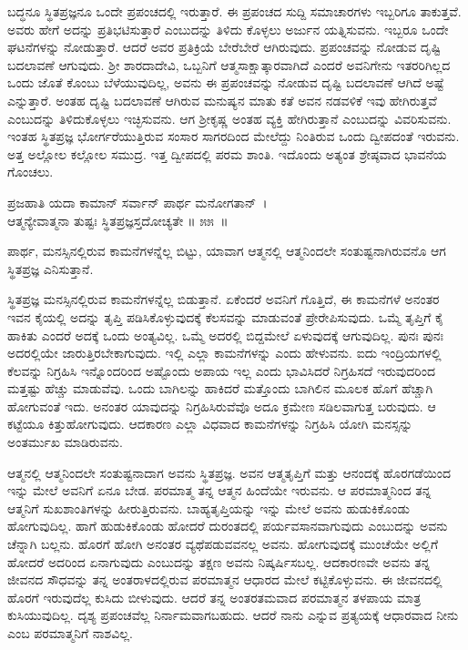 ಬದ್ಧನೂ ಸ್ಥಿತಪ್ರಜ್ಞನೂ ಒಂದೇ ಪ್ರಪಂಚದಲ್ಲಿ ಇರುತ್ತಾರೆ. ಈ ಪ್ರಪಂಚದ ಸುದ್ದಿ ಸಮಾಚಾರಗಳು ಇಬ್ಬರಿಗೂ ತಾಕುತ್ತವೆ. ಅವರು ಹೇಗೆ ಅದನ್ನು ಪ್ರತಿಭಟಿಸುತ್ತಾರೆ ಎಂಬುದನ್ನು ತಿಳಿದು ಕೊಳ್ಳಲು ಅರ್ಜುನ ಯತ್ನಿಸುವನು. ಇಬ್ಬರೂ ಒಂದೇ ಘಟನೆಗಳನ್ನು ನೋಡುತ್ತಾರೆ. ಆದರೆ ಅವರ ಪ್ರತಿಕ್ರಿಯೆ ಬೇರೆಬೇರೆ ಆಗಿರುವುದು. ಪ್ರಪಂಚವನ್ನು ನೋಡುವ ದೃಷ್ಟಿ ಬದಲಾವಣೆ ಆಗುವುದು. ಶ‍್ರೀ ಶಾರದಾದೇವಿ, ಒಬ್ಬನಿಗೆ ಆತ್ಮಸಾಕ್ಷಾತ್ಕಾರವಾಗಿದೆ ಎಂದರೆ ಅವನಿಗೇನು ಇತರರಿಗಿಲ್ಲದ ಒಂದು ಜೊತೆ ಕೊಂಬು ಬೆಳೆಯುವುದಿಲ್ಲ, ಅವನು ಈ ಪ್ರಪಂಚವನ್ನು ನೋಡುವ ದೃಷ್ಟಿ ಬದಲಾವಣೆ ಆಗಿದೆ ಅಷ್ಟೆ ಎನ್ನುತ್ತಾರೆ. ಅಂತಹ ದೃಷ್ಟಿ ಬದಲಾವಣೆ ಆಗಿರುವ ಮನುಷ್ಯನ ಮಾತು ಕತೆ ಅವನ ನಡವಳಿಕೆ ಇವು ಹೇಗಿರುತ್ತವೆ ಎಂಬುದನ್ನು ತಿಳಿದುಕೊಳ್ಳಲು ಇಚ್ಛಿಸುವನು. ಆಗ ಶ‍್ರೀಕೃಷ್ಣ ಅಂತಹ ವ್ಯಕ್ತಿ ಹೇಗಿರುತ್ತಾನೆ ಎಂಬುದನ್ನು ವಿವರಿಸುವನು. ಇಂತಹ ಸ್ಥಿತಪ್ರಜ್ಞ ಭೋರ್ಗರೆಯುತ್ತಿರುವ ಸಂಸಾರ ಸಾಗರದಿಂದ ಮೇಲೆದ್ದು ನಿಂತಿರುವ ಒಂದು ದ್ವೀಪದಂತೆ ಇರು\-ವನು. ಅತ್ತ ಅಲ್ಲೋಲ ಕಲ್ಲೋಲ ಸಮುದ್ರ. ಇತ್ತ ದ್ವೀಪದಲ್ಲಿ ಪರಮ ಶಾಂತಿ. ಇದೊಂದು ಅತ್ಯಂತ ಶ್ರೇಷ್ಠವಾದ ಭಾವನೆಯ ಗೊಂಚಲು.

\begin{shloka}
ಪ್ರಜಹಾತಿ ಯದಾ ಕಾಮಾನ್ ಸರ್ವಾನ್ ಪಾರ್ಥ ಮನೋಗತಾನ್~।\\ಆತ್ಮನ್ಯೇವಾತ್ಮನಾ ತುಷ್ಟಃ ಸ್ಥಿತಪ್ರಜ್ಞಸ್ತದೋಚ್ಯತೇ \hfill॥ ೫೫~॥
\end{shloka}

\begin{artha}
ಪಾರ್ಥ, ಮನಸ್ಸಿನಲ್ಲಿರುವ ಕಾಮನೆಗಳನ್ನೆಲ್ಲ ಬಿಟ್ಟು, ಯಾವಾಗ ಆತ್ಮನಲ್ಲಿ ಆತ್ಮನಿಂದಲೇ ಸಂತುಷ್ಟ\-ನಾಗಿರುವನೊ ಆಗ ಸ್ಥಿತಪ್ರಜ್ಞ ಎನಿಸುತ್ತಾನೆ.
\end{artha}

ಸ್ಥಿತಪ್ರಜ್ಞ ಮನಸ್ಸಿನಲ್ಲಿರುವ ಕಾಮನೆಗಳನ್ನೆಲ್ಲ ಬಿಡುತ್ತಾನೆ. ಏಕೆಂದರೆ ಅವನಿಗೆ ಗೊತ್ತಿದೆ, ಈ ಕಾಮನೆಗಳೆ ಅನಂತರ ಇವನ ಕೈಯಲ್ಲಿ ಅದನ್ನು ತೃಪ್ತಿ ಪಡಿಸಿಕೊಳ್ಳುವುದಕ್ಕೆ ಕೆಲಸವನ್ನು ಮಾಡುವಂತೆ ಪ್ರೇರೇಪಿಸುವುದು. ಒಮ್ಮೆ ತೃಪ್ತಿಗೆ ಕೈ ಹಾಕಿತು ಎಂದರೆ ಅದಕ್ಕೆ ಒಂದು ಅಂತ್ಯವಿಲ್ಲ. ಒಮ್ಮೆ ಅದರಲ್ಲಿ ಬಿದ್ದಮೇಲೆ ಏಳುವುದಕ್ಕೆ ಆಗುವುದಿಲ್ಲ. ಪುನಃ ಪುನಃ ಅದರಲ್ಲಿಯೇ ಜಾರುತ್ತಿರಬೇಕಾಗುವುದು. ಇಲ್ಲಿ ಎಲ್ಲಾ ಕಾಮನೆಗಳನ್ನು ಎಂದು ಹೇಳುವನು. ಐದು ಇಂದ್ರಿಯಗಳಲ್ಲಿ ಕೆಲವನ್ನು ನಿಗ್ರಹಿಸಿ ಇನ್ನೊಂದರಿಂದ ಅಷ್ಟೊಂದು ಅಪಾಯ ಇಲ್ಲ ಎಂದು ಭಾವಿಸಿದರೆ ನಿಗ್ರಹಿಸದೆ ಇರುವುದರಿಂದ ಮತ್ತಷ್ಟು ಹೆಚ್ಚು ಮಾಡುವೆವು. ಒಂದು ಬಾಗಿಲನ್ನು ಹಾಕಿದರೆ ಮತ್ತೊಂದು ಬಾಗಿಲಿನ ಮೂಲಕ ಹೊಗೆ ಹೆಚ್ಚಾಗಿ ಹೋಗುವಂತೆ ಇದು. ಅನಂತರ ಯಾವುದನ್ನು ನಿಗ್ರಹಿಸಿರುವೆವೊ ಅದೂ ಕ್ರಮೇಣ ಸಡಿಲವಾಗುತ್ತ ಬರುವುದು. ಆ ಕಟ್ಟೆಯೂ ಕಿತ್ತುಹೋಗುವುದು. ಆದಕಾರಣ ಎಲ್ಲಾ ವಿಧವಾದ ಕಾಮನೆಗಳನ್ನು ನಿಗ್ರಹಿಸಿ ಯೋಗಿ ಮನಸ್ಸನ್ನು ಅಂತರ್ಮುಖ ಮಾಡಿರುವನು.

\newpage

ಆತ್ಮನಲ್ಲಿ ಆತ್ಮನಿಂದಲೇ ಸಂತುಷ್ಟನಾದಾಗ ಅವನು ಸ್ಥಿತಪ್ರಜ್ಞ. ಅವನ ಆತ್ಮತೃಪ್ತಿಗೆ ಮತ್ತು ಆನಂದಕ್ಕೆ ಹೊರಗಡೆಯಿಂದ ಇನ್ನು ಮೇಲೆ ಅವನಿಗೆ ಏನೂ ಬೇಡ. ಪರಮಾತ್ಮ ತನ್ನ ಆತ್ಮನ ಹಿಂದೆಯೇ ಇರುವನು. ಆ ಪರಮಾತ್ಮನಿಂದ ತನ್ನ ಆತ್ಮನಿಗೆ ಸುಖಶಾಂತಿಗಳನ್ನು ಹೀರುತ್ತಿರುವನು. ಬಾಹ್ಯತೃಪ್ತಿಯನ್ನು ಇನ್ನು ಮೇಲೆ ಅವನು ಹುಡುಕಿಕೊಂಡು ಹೋಗುವುದಿಲ್ಲ. ಹಾಗೆ ಹುಡುಕಿಕೊಂಡು ಹೋದರೆ ದುರಂತದಲ್ಲಿ ಪರ್ಯವಸಾನವಾಗುವುದು ಎಂಬುದನ್ನು ಅವನು ಚೆನ್ನಾಗಿ ಬಲ್ಲನು. ಹೊರಗೆ ಹೋಗಿ ಅನಂತರ ವ್ಯಥೆಪಡುವವನಲ್ಲ ಅವನು. ಹೋಗುವುದಕ್ಕೆ ಮುಂಚೆಯೇ ಅಲ್ಲಿಗೆ ಹೋದರೆ ಅದರಿಂದ ಏನಾಗುವುದು ಎಂಬುದನ್ನು ತಕ್ಷಣ ಅವನು ನಿಷ್ಕರ್ಷಿಸಬಲ್ಲ. ಆದಕಾರಣವೇ ಅವನು ತನ್ನ ಜೀವನದ ಸೌಧವನ್ನು ತನ್ನ ಅಂತರಾಳದಲ್ಲಿರುವ ಪರಮಾತ್ಮನ ಆಧಾರದ ಮೇಲೆ ಕಟ್ಟಿಕೊಳ್ಳುವನು. ಈ ಜೀವನದಲ್ಲಿ ಹೊರಗೆ ಇರುವುದೆಲ್ಲ ಕುಸಿದು ಬೀಳುವುದು. ಆದರೆ ತನ್ನ ಅಂತರತಮವಾದ ಪರಮಾತ್ಮನ ತಳಪಾಯ ಮಾತ್ರ ಕುಸಿಯುವುದಿಲ್ಲ. ದೃಶ್ಯ ಪ್ರಪಂಚವೆಲ್ಲ ನಿರ್ನಾಮವಾಗಬಹುದು. ಆದರೆ ನಾನು ಎನ್ನುವ ಪ್ರತ್ಯಯಕ್ಕೆ ಆಧಾರವಾದ ನೀನು ಎಂಬ ಪರಮಾತ್ಮನಿಗೆ ನಾಶವಿಲ್ಲ.

